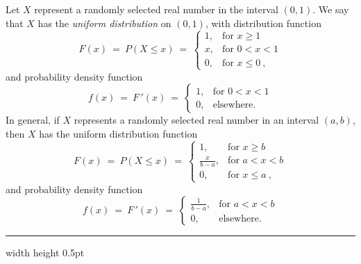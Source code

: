 \begin{exmp}\label{exmp:unifdistrib}
 Let $X$ represent a randomly selected real number in the interval $(0,1)$. We say that $X$ 
 has the \emph{uniform distribution} on $(0,1)$, with distribution function
  \begin{equation}
   F(x) ~=~ P(X \le x)
   ~=~ \begin{cases}
   1, &\text{for $x \ge 1$}\\
   x, &\text{for $0 < x < 1$}\\
   0, &\text{for $x \le 0~$,}
  \end{cases}
 \end{equation}
 and probability density function
 \begin{equation}
   f(x) ~=~ F\,'(x)
   ~=~ \begin{cases}
   1, &\text{for $0 < x < 1$}\\
   0, &\text{elsewhere.}
  \end{cases}
 \end{equation}
 In general, if $X$ represents a randomly selected real number in an interval $(a,b)$, then $X$ has the uniform
 distribution function
 \begin{equation}
   F(x) ~=~ P(X \le x)
   ~=~ \begin{cases}
   1, &\text{for $x \ge b$}\\
   \frac{x}{b-a}, &\text{for $a < x < b$}\\
   0, &\text{for $x \le a~$,}
  \end{cases}
 \end{equation}
 and probability density function
 \begin{equation}
   f(x) ~=~ F\,'(x)
   ~=~ \begin{cases}
   \frac{1}{b-a}, &\text{for $a < x < b$}\\
   0, &\text{elsewhere.}
  \end{cases}
 \end{equation}
\end{exmp}
\hrule width \textwidth height 0.5pt
\newpage
